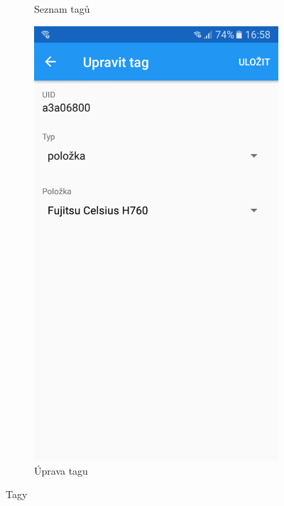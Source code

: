 \documentclass[czech,BP]{thesiskiv}
\begin{document}
\begin{figure}[H]
\begin{subfigure}[b]{0.3\textwidth}
	\caption{Seznam tagů}
	\label{fig:Screenshot_20170607-164958}
  \end{subfigure}
  \begin{subfigure}[b]{0.3\textwidth}
    \centering
	\includegraphics[width=\textwidth]{../images/client_android/Screenshot_20170607-165805.png}	
	\caption{Úprava tagu}
	\label{fig:Screenshot_20170607-165805}
  \end{subfigure}
  \caption{Tagy}
\end{figure}
\end{document}
